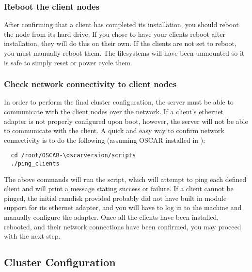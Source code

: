 \subsubsection{Reboot the client nodes}

After confirming that a client has completed its installation, you
should reboot the node from its hard drive. If you chose to have your
clients reboot after installation, they will do this on their
own. If the clients are not set to reboot, you must manually
reboot them. The filesystems will have been unmounted so it is safe
to simply reset or power cycle them.

\subsubsection{Check network connectivity to client nodes}

In order to perform the final cluster configuration, the server must
be able to communicate with the client nodes over the network. If a
client's ethernet adapter is not properly configured upon boot,
however, the server will not be able to communicate with the client. A
quick and easy way to confirm network connectivity is to do the
\begchange
following (assuming OSCAR installed in ):

\begin{verbatim}
  cd /root/OSCAR-\oscarversion/scripts
  ./ping_clients
\end{verbatim}
\endchange

The above commands will run the  script, which will
attempt to ping each defined client and will print a message stating
success or failure. If a client cannot be pinged, the initial ramdisk
provided probably did not have built in module support for its
ethernet adapter, and you will have to log in to the machine and
manually configure the adapter. Once all the clients have been
installed, rebooted, and their network connections have been
confirmed, you may proceed with the next step.


\subsection{Cluster Configuration}


